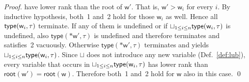 \begin{proof}
  have lower rank than the root of $\mathsf{w}'$. That is, $\mathsf{w}'>\mathsf{w}_i$
  for every $i$. By inductive hypothesis, both~1 and~2 hold for those $\mathsf{w}_i$ as well. Hence
  all $\mathsf{type}(\mathsf{w}_i,\tau)$ terminate. If any of them is undefined
  or if $\sqcup_{1\le i\le n}\mathsf{type}(\mathsf{w}_i,\tau)$ is undefined, also
  $\mathsf{type}(\mathtt{*}\mathsf{w}',\tau)$ is undefined and therefore terminates and
  satisfies~2 vacuously. Otherwise
  $\mathsf{type}(\mathtt{*}\mathsf{w}',\tau)$ terminates and yields
  $\sqcup_{1\le i\le n}\mathsf{type}(\mathsf{w}_i,\tau)$.
  Since $\sqcup$ does not introduce any new variable
  (Def.~\ref{def:lub}), every variable that occurs in
  $\sqcup_{1\le i\le n}\mathsf{type}(\mathsf{w}_i,\tau)$ has lower rank than
  $\mathsf{root}(\mathsf{w}')=\mathsf{root}(\mathsf{w})$. Therefore
  both~1 and~2 hold for $\mathsf{w}$ also in this case.
  \qed
\end{proof}
